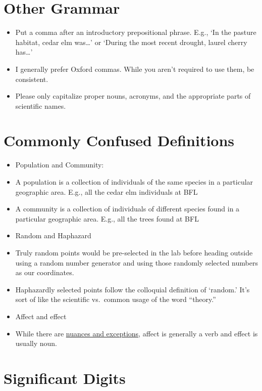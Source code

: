 \documentclass[]{book}
\providecommand{\tightlist}{%
  \setlength{\itemsep}{0pt}\setlength{\parskip}{0pt}}
\begin{document}
\section{Other Grammar}\label{other-grammar}

\begin{itemize}
\tightlist
\item
  Put a comma after an introductory prepositional phrase. E.g., `In the
  pasture habitat, cedar elm was\ldots{}' or `During the most recent
  drought, laurel cherry has\ldots{}'
\item
  I generally prefer Oxford commas. While you aren't required to use
  them, be consistent.
\item
  Please only capitalize proper nouns, acronyms, and the appropriate
  parts of scientific names.
\end{itemize}

\section{Commonly Confused
Definitions}\label{commonly-confused-definitions}

\begin{itemize}
\tightlist
\item
  Population and Community:
\item
  A population is a collection of individuals of the same species in a
  particular geographic area. E.g., all the cedar elm individuals at BFL
\item
  A community is a collection of individuals of different species found
  in a particular geographic area. E.g., all the trees found at BFL
\item
  Random and Haphazard
\item
  Truly random points would be pre-selected in the lab before heading
  outside using a random number generator and using those randomly
  selected numbers as our coordinates.
\item
  Haphazardly selected points follow the colloquial definition of
  `random.' It's sort of like the scientific vs.~common usage of the
  word ``theory.''
\item
  Affect and effect
\item
  While there are
  \href{https://www.grammarly.com/blog/affect-vs-effect/}{nuances and
  exceptions}, affect is generally a verb and effect is usually noun.
\end{itemize}

\section{Significant Digits}\label{significant-digits}
\end{document}
